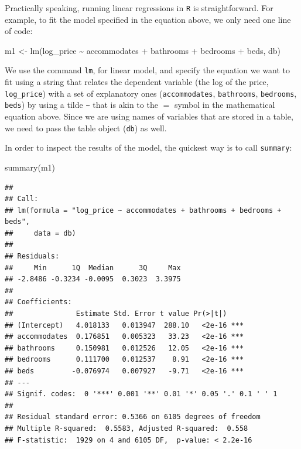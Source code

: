 \documentclass[
]{book}
\newenvironment{Shaded}{\begin{snugshade}}{\end{snugshade}}
\newcommand{\FunctionTok}[1]{\textcolor[rgb]{0.00,0.00,0.00}{#1}}
\newcommand{\NormalTok}[1]{#1}
\newcommand{\OtherTok}[1]{\textcolor[rgb]{0.56,0.35,0.01}{#1}}
\newcommand{\StringTok}[1]{\textcolor[rgb]{0.31,0.60,0.02}{#1}}
\begin{document}
Practically speaking, running linear regressions in \texttt{R} is straightforward. For example, to fit the model specified in the equation above, we only need one line of code:

\begin{Shaded}
\begin{Highlighting}[]
\NormalTok{m1 }\OtherTok{\textless{}{-}} \FunctionTok{lm}\NormalTok{(}\StringTok{\textquotesingle{}log\_price \textasciitilde{} accommodates + bathrooms + bedrooms + beds\textquotesingle{}}\NormalTok{, db)}
\end{Highlighting}
\end{Shaded}

We use the command \texttt{lm}, for linear model, and specify the equation we want to fit using a string that relates the dependent variable (the log of the price, \texttt{log\_price}) with a set of explanatory ones (\texttt{accommodates}, \texttt{bathrooms}, \texttt{bedrooms}, \texttt{beds}) by using a tilde \texttt{\textasciitilde{}} that is akin to the \(=\) symbol in the mathematical equation above. Since we are using names of variables that are stored in a table, we need to pass the table object (\texttt{db}) as well.

In order to inspect the results of the model, the quickest way is to call \texttt{summary}:

\begin{Shaded}
\begin{Highlighting}[]
\FunctionTok{summary}\NormalTok{(m1)}
\end{Highlighting}
\end{Shaded}

\begin{verbatim}
## 
## Call:
## lm(formula = "log_price ~ accommodates + bathrooms + bedrooms + beds", 
##     data = db)
## 
## Residuals:
##     Min      1Q  Median      3Q     Max 
## -2.8486 -0.3234 -0.0095  0.3023  3.3975 
## 
## Coefficients:
##               Estimate Std. Error t value Pr(>|t|)    
## (Intercept)   4.018133   0.013947  288.10   <2e-16 ***
## accommodates  0.176851   0.005323   33.23   <2e-16 ***
## bathrooms     0.150981   0.012526   12.05   <2e-16 ***
## bedrooms      0.111700   0.012537    8.91   <2e-16 ***
## beds         -0.076974   0.007927   -9.71   <2e-16 ***
## ---
## Signif. codes:  0 '***' 0.001 '**' 0.01 '*' 0.05 '.' 0.1 ' ' 1
## 
## Residual standard error: 0.5366 on 6105 degrees of freedom
## Multiple R-squared:  0.5583, Adjusted R-squared:  0.558 
## F-statistic:  1929 on 4 and 6105 DF,  p-value: < 2.2e-16
\end{verbatim}
\end{document}
